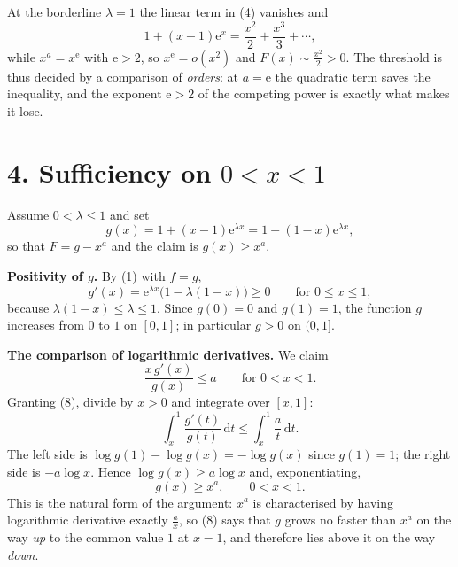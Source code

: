 \documentclass[12pt]{article}
\newcommand{\dd}{\,\mathrm{d}}
\newcommand{\e}{\mathrm{e}}
\newcommand{\LL}{\lambda}
\begin{document}
At the borderline \(\LL=1\) the linear term in (4) vanishes and
\[
1+(x-1)\e^{x}=\frac{x^2}{2}+\frac{x^3}{3}+\cdots,
\]
while \(x^{a}=x^{\e}\) with \(\e>2\), so \(x^{\e}=o(x^2)\) and
\(F(x)\sim\frac{x^2}{2}>0\). The threshold is thus decided by a
comparison of \emph{orders}: at \(a=\e\) the quadratic term saves the
inequality, and the exponent \(\e>2\) of the competing power is exactly
what makes it lose.

\section*{4. Sufficiency on \(0<x<1\)}

Assume \(0<\LL\le1\) and set
\[
g(x)=1+(x-1)\e^{\LL x}=1-(1-x)\e^{\LL x},
\]
so that \(F=g-x^a\) and the claim is \(g(x)\ge x^a\).

\textbf{Positivity of \(g\).} By (1) with \(f=g\),
\[
g'(x)=\e^{\LL x}\bigl(1-\LL(1-x)\bigr)\ge0
\qquad\text{for }0\le x\le1,
\tag{7}
\]
because \(\LL(1-x)\le\LL\le1\). Since \(g(0)=0\) and \(g(1)=1\), the
function \(g\) increases from \(0\) to \(1\) on \([0,1]\); in particular
\(g>0\) on \((0,1]\).

\textbf{The comparison of logarithmic derivatives.} We claim
\[
\frac{x\,g'(x)}{g(x)}\le a\qquad\text{for }0<x<1 .
\tag{8}
\]
Granting (8), divide by \(x>0\) and integrate over \([x,1]\):
\[
\int_x^1\frac{g'(t)}{g(t)}\dd t\le\int_x^1\frac{a}{t}\dd t .
\]
The left side is \(\log g(1)-\log g(x)=-\log g(x)\) since \(g(1)=1\); the
right side is \(-a\log x\). Hence \(\log g(x)\ge a\log x\) and,
exponentiating,
\[
g(x)\ge x^a,\qquad 0<x<1 .
\tag{9}
\]
This is the natural form of the argument: \(x^a\) is characterised by
having logarithmic derivative exactly \(\frac ax\), so (8) says that
\(g\) grows no faster than \(x^a\) on the way \emph{up} to the common
value \(1\) at \(x=1\), and therefore lies above it on the way
\emph{down}.
\end{document}
